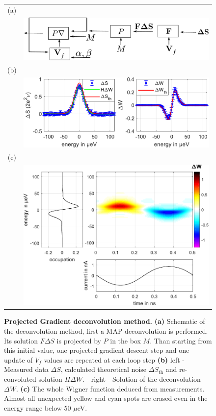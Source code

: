 \begin{figure}[hptb]
	\begin{center}
		\begin{tabular}{c c}
			(a) &  \\ 
			
			& \includegraphics[width = 8 cm]{./appA/ProjGrad_deconvolution} \\ 
			
			(b) &  \\ 
			
			& \includegraphics[width = 10 cm]{./appA/PG_result} \\
			
			(c) &  \\ 
			
			& \includegraphics[width = 10 cm]{./appA/PG_wigner}
		\end{tabular} 
	\end{center}
	
	\caption{\textbf{Projected Gradient deconvolution method.} \textbf{(a)} Schematic of the deconvolution method, first a MAP deconvolution is performed. Its solution $F\Delta S$ is projected by $P$ in the box $M$. Than starting from this initial value, one projected gradient descent step and one update of $V_{f}$ values are repeated at each loop step \textbf{(b)} left - Measured data $\Delta S$, calculated theoretical noise $\Delta S_{\mathrm{th}}$ and re-convoluted solution $H\Delta W$. - right - Solution of the deconvolution $\Delta W$. \textbf{(c)} The whole Wigner function deduced from measurements. Almost all unexpected yellow and cyan spots are erased even in the energy range below 50 $\mu$eV.}
	\label{fig: ProjGrad deconvolution}
\end{figure}

